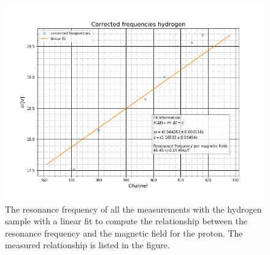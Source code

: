 \begin{figure}[h]
	\includegraphics[scale=0.5]{Bild/hydrogen}
	\centering
	\caption[Plot of the hydrogen resonance frequencies per magnetic field strength]{The resonance frequency of all the measurements with the hydrogen sample with a linear fit to compute the relationship between the resonance frequency and the magnetic field for the proton. The measured relationship is listed in the figure.}
	\label{hydrogen_pic}
\end{figure}